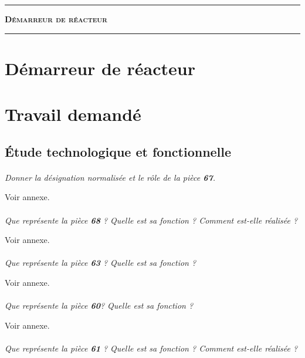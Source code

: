 \documentclass[11pt,oneside]{article}
\begin{document}
\vspace{0.5cm}


\vspace{1cm}


\noindent\rule{\linewidth}{.2pt}
\begin{center}
 \LARGE\textbf{\textsc{Démarreur de réacteur}}
\end{center}
\noindent\rule{\linewidth}{.2pt}

\section*{Démarreur de réacteur}

\section*{Travail demandé}

\subsection*{Étude technologique et fonctionnelle}

\paragraph{}
\textit{Donner la désignation normalisée et le rôle de la pièce \textbf{67}.}

Voir annexe.

\paragraph{}
\textit{Que représente la pièce \textbf{68} ? Quelle est sa fonction ? Comment est-elle réalisée ?}

Voir annexe.

\paragraph{}
\textit{Que représente la pièce \textbf{63} ? Quelle est sa fonction ?}

Voir annexe.

\paragraph{}
\textit{Que représente la pièce \textbf{60}? Quelle est sa fonction ?}

Voir annexe.

\paragraph{}
\textit{Que représente la pièce \textbf{61} ? Quelle est sa fonction ? Comment est-elle réalisée ?}
\end{document}

